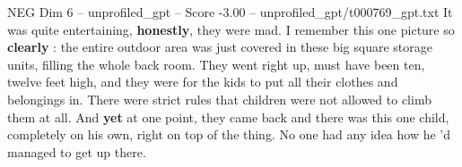 \begin{textsample}{NEG Dim 6 – unprofiled\_gpt – Score -3.00 – unprofiled\_gpt/t000769\_gpt.txt}  \label{ex:f6_neg_028}
It was quite entertaining, \textbf{honestly}, they were mad.
I remember this one picture so \textbf{clearly} : the entire outdoor area was just covered in these big square storage units, filling the whole back room.
They went right up, must have been ten, twelve feet high, and they were for the kids to put all their clothes and belongings in.
There were strict rules that children were not allowed to climb them at all.
And \textbf{yet} at one point, they came back and there was this one child, completely on his own, right on top of the thing.
No one had any idea how he ’d managed to get up there.

\end{textsample}
